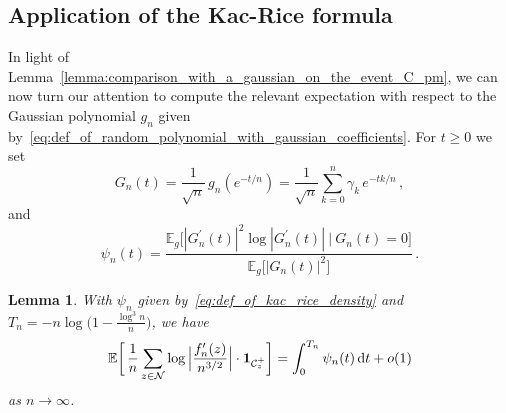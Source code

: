 \documentclass[11pt]{amsart}
\newtheorem{lemma}[theorem]{Lemma}
\theoremstyle{remark}
\theoremstyle{definition}
\newcommand{\bE}{\mathbb E}
\newcommand{\cC}{\mathcal C}
\newcommand{\cN}{\mathcal N}
\newcommand{\one}{\boldsymbol{1}}
\begin{document}
    \subsection{Application of the Kac-Rice formula}
    \label{subsection:application_of_kac_rice}
    In light of Lemma~\ref{lemma:comparison_with_a_gaussian_on_the_event_C_pm}, we can now turn our attention to compute the relevant expectation with respect to the Gaussian polynomial $g_n$ given by~\eqref{eq:def_of_random_polynomial_with_gaussian_coefficients}. For $t\ge 0$ we set
    \begin{equation}
    \label{eq:def_of_normalized_gaussian_random_polynomial}
        G_n(t) = \frac{1}{\sqrt{n}} \,  g_n(e^{-t/n}) = \frac{1}{\sqrt{n}} \sum_{k=0}^{n} \gamma_k  \, e^{-tk/n} \, ,
    \end{equation}
    and
    \begin{equation}
        \label{eq:def_of_kac_rice_density}
        \psi_n(t) = \frac{\bE_g\Big[ |G_n^\prime(t)|^2 \log|G_n^\prime(t)| \  \big| \  G_n(t)=0\Big]}{ \bE_g\big[|G_n(t)|^2\big]} \, .
    \end{equation}
    \begin{lemma}
        \label{lemma:application_of_Kac_Rice}
        With $\psi_n$ given by~\eqref{eq:def_of_kac_rice_density} and $\displaystyle T_n = -n\log\Big(1-\frac{\log^3 n}{n} \Big) $, we have 
        \[
        \bE\bigg[ \,  \frac{1}{n} \sum_{z \in \cN} \log \Big|\frac{f_n'(z)}{n^{3/2}} \Big| \cdot \one_{\cC_z^+} \bigg] = \int_{0}^{T_n} \psi_n(t) \, {\rm d}t + o(1)
        \]
        as $n\to \infty$.  
    \end{lemma}
\end{document}
